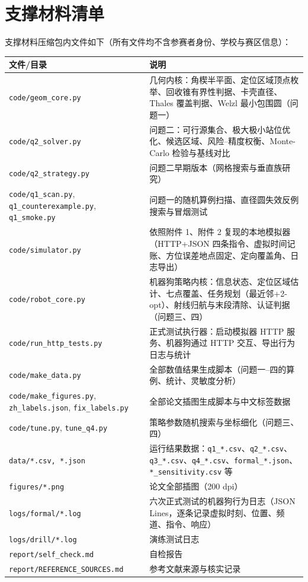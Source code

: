 
\appendix
\section{支撑材料清单}

支撑材料压缩包内文件如下（所有文件均不含参赛者身份、学校与赛区信息）：

\begin{longtable}{p{6.6cm}p{8.4cm}}
\toprule
文件/目录 & 说明\\
\midrule
\endhead
\texttt{code/geom\_core.py} & 几何内核：角楔半平面、定位区域顶点枚举、回收锥有界性判据、卡壳直径、Thales 覆盖判据、Welzl 最小包围圆（问题一）\\
\texttt{code/q2\_solver.py} & 问题二：可行源集合、极大极小站位优化、候选区域、风险--精度权衡、Monte-Carlo 检验与基线对比\\
\texttt{code/q2\_strategy.py} & 问题二早期版本（网格搜索与垂直族研究）\\
\texttt{code/q1\_scan.py}, \texttt{q1\_counterexample.py}, \texttt{q1\_smoke.py} & 问题一的随机算例扫描、直径圆失效反例搜索与冒烟测试\\
\texttt{code/simulator.py} & 依照附件 1、附件 2 复现的本地模拟器（HTTP+JSON 四条指令、虚拟时间记账、方位误差地点固定、定向覆盖角、日志导出）\\
\texttt{code/robot\_core.py} & 机器狗策略内核：信息状态、定位区域估计、七点覆盖、任务规划（最近邻+2-opt）、射线归航与末段清除、认证判据（问题三、四）\\
\texttt{code/run\_http\_tests.py} & 正式测试执行器：启动模拟器 HTTP 服务、机器狗通过 HTTP 交互、导出行为日志与统计\\
\texttt{code/make\_data.py} & 全部数值结果生成脚本（问题一--四的算例、统计、灵敏度分析）\\
\texttt{code/make\_figures.py}, \texttt{zh\_labels.json}, \texttt{fix\_labels.py} & 全部论文插图生成脚本与中文标签数据\\
\texttt{code/tune.py}, \texttt{tune\_q4.py} & 策略参数随机搜索与坐标细化（问题三、四）\\
\texttt{data/*.csv, *.json} & 运行结果数据：\texttt{q1\_*.csv}、\texttt{q2\_*.csv}、\texttt{q3\_*.csv}、\texttt{q4\_*.csv}、\texttt{formal\_*.json}、\texttt{*\_sensitivity.csv} 等\\
\texttt{figures/*.png} & 论文全部插图（200 dpi）\\
\texttt{logs/formal/*.log} & 六次正式测试的机器狗行为日志（JSON Lines，逐条记录虚拟时刻、位置、频道、指令、响应）\\
\texttt{logs/drill/*.log} & 演练测试日志\\
\texttt{report/self\_check.md} & 自检报告\\
\texttt{report/REFERENCE\_SOURCES.md} & 参考文献来源与核实记录\\
\bottomrule
\end{longtable}
